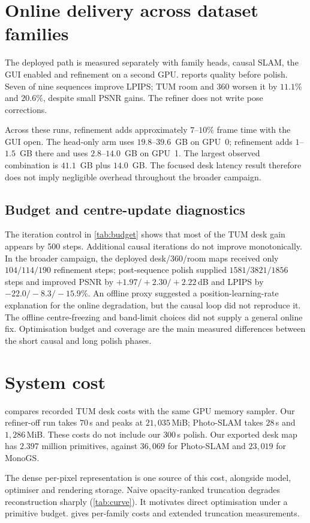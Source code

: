 

\section{Online delivery across dataset families}
\label{sec:exp:online}

The deployed path is measured separately with family heads, causal SLAM,
the GUI enabled and refinement on a second GPU.  reports
quality before polish. Seven of nine sequences improve LPIPS; TUM room and
360 worsen it by $11.1\%$ and $20.6\%$, despite small PSNR gains.
The refiner does not write pose corrections.



Across these runs, refinement adds approximately $7$--$10\%$ frame time
with the GUI open. The head-only arm uses $19.8$--$39.6$~GB on GPU~0;
refinement adds $1$--$1.5$~GB there and uses $2.8$--$14.0$~GB on GPU~1.
The largest observed combination is $41.1$~GB plus $14.0$~GB.
The focused desk latency result therefore does not imply negligible
overhead throughout the broader campaign.

\subsection{Budget and centre-update diagnostics}



The iteration control in \cref{tab:budget} shows that most of the TUM desk
gain appears by 500 steps. Additional causal iterations do not improve
monotonically. In the broader campaign, the deployed desk/360/room maps
received only $104/114/190$ refinement
steps; post-sequence polish supplied $1581/3821/1856$ steps and improved
PSNR by $+1.97/+2.30/+2.22$\,dB and LPIPS by $-22.0/-8.3/-15.9\%$.
An offline proxy suggested a position-learning-rate explanation for the
online degradation, but the causal loop did not reproduce it.
The offline centre-freezing and band-limit choices did not supply a
general online fix. Optimisation budget and coverage are the main measured
differences between the short causal and long polish phases.

\section{System cost}
\label{sec:exp:cost}

 compares recorded TUM desk costs with the same GPU memory
sampler. Our refiner-off run takes $70$\,s and peaks at $21{,}035$\,MiB;
Photo-SLAM takes $28$\,s and $1{,}286$\,MiB. These costs do not include
our $300$\,s polish.
Our exported desk map has $2.397$ million primitives, against $36{,}069$
for Photo-SLAM and $23{,}019$ for MonoGS.



The dense per-pixel representation is one source of this cost, alongside
model, optimiser and rendering storage. Naive opacity-ranked truncation
degrades reconstruction sharply (\cref{tab:curve}). It motivates
direct optimisation under a primitive budget.  gives
per-family costs and extended truncation measurements.
